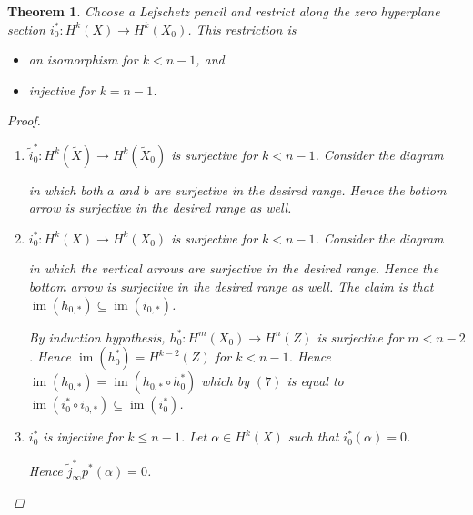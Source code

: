 \documentclass[A4paper, british, reqno]{amsart}
\theoremstyle{darkgreentheorem}
\newtheorem{thm}{Theorem}[section]
\theoremstyle{darkbluedefinition}
\theoremstyle{darkredexample}
\theoremstyle{remark}
\DeclareMathOperator{\im}{im}
\newcommand{\1}{\mathbbm{1}}
\newcommand{\op}{\oplus}
\newcommand{\sub}{\subseteq}
\begin{document}
\begin{thm}
    Choose a Lefschetz pencil and restrict along the zero hyperplane section $i_{0}^{*}\colon H^{k}(X)\to H^{k}(X_{0})$.
    This restriction is
    \begin{itemize}
	\item an isomorphism for $k<n-1$, and
	\item injective for $k=n-1$.
    \end{itemize}
    \begin{proof}
	\begin{enumerate}
	    \item $\tilde{i}_{0}^{*}\colon H^{k}(\tilde{X})\to H^{k}(\tilde{X}_{0})$ is surjective for $k<n-1$.
		Consider the diagram
		\begin{center}
		\end{center}
		in which both $a$ and $b$ are surjective in the desired range.
		Hence the bottom arrow is surjective in the desired range as well.
	    \item $i_{0}^{*}\colon H^{k}(X)\to H^{k}(X_{0})$ is surjective for $k<n-1$.
		Consider the diagram
		\begin{center}
		\end{center}
		in which the vertical arrows are surjective in the desired range.
		Hence the bottom arrow is surjective in the desired range as well.
		The claim is that $\im(h_{0,*})\sub \im(i_{0,*})$.

		By induction hypothesis, $h_{0}^{*}\colon H^{m}(X_{0})\to H^{n}(Z)$ is surjective for $m<n-2$.
		Hence $\im(h_{0}^{*})=H^{k-2}(Z)$ for $k<n-1$.
		Hence $\im(h_{0,*})=\im(h_{0,*}\circ h_{0}^{*})$ which by $(7)$ is equal to $\im(i_{0}^{*}\circ i_{0,*})\sub \im(i_{0}^{*})$.
	    \item $i_{0}^{*}$ is injective for $k\leqslant n-1$.
		Let $\alpha\in H^{k}(X)$ such that $i_{0}^{*}(\alpha)=0$.
		\begin{center}
		\end{center}
		Hence $\tilde{j}_{\infty}^{*}p^{*}(\alpha)=0$.


\end{enumerate}
\end{proof}
\end{thm}
\end{document}
